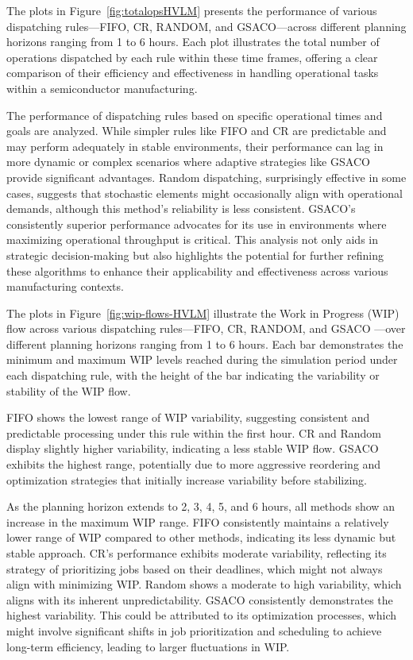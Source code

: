 The plots in Figure~\ref{fig:totalopsHVLM} presents the performance of various dispatching rules—FIFO, CR, RANDOM, and GSACO—across different planning horizons ranging from 1 to 6 hours. Each plot illustrates the total number of operations dispatched by each rule within these time frames, offering a clear comparison of their efficiency and effectiveness in handling operational tasks within a semiconductor manufacturing.

The performance of dispatching rules based on specific operational times and goals are analyzed. While simpler rules like FIFO and CR are predictable and may perform adequately in stable environments, their performance can lag in more dynamic or complex scenarios where adaptive strategies like GSACO provide significant advantages. Random dispatching, surprisingly effective in some cases, suggests that stochastic elements might occasionally align with operational demands, although this method’s reliability is less consistent. GSACO’s consistently superior performance advocates for its use in environments where maximizing operational throughput is critical. This analysis not only aids in strategic decision-making but also highlights the potential for further refining these algorithms to enhance their applicability and effectiveness across various manufacturing contexts.

The plots in Figure~\ref{fig:wip-flows-HVLM} illustrate the Work in Progress (WIP) flow across various dispatching rules—FIFO, CR, RANDOM, and GSACO —over different planning horizons ranging from 1 to 6 hours. Each bar demonstrates the minimum and maximum WIP levels reached during the simulation period under each dispatching rule, with the height of the bar indicating the variability or stability of the WIP flow.

FIFO shows the lowest range of WIP variability, suggesting consistent and predictable processing under this rule within the first hour. CR and Random display slightly higher variability, indicating a less stable WIP flow.
GSACO exhibits the highest range, potentially due to more aggressive reordering and optimization strategies that initially increase variability before stabilizing.

As the planning horizon extends to 2, 3, 4, 5, and 6 hours, all methods show an increase in the maximum WIP range. FIFO consistently maintains a relatively lower range of WIP compared to other methods, indicating its less dynamic but stable approach.
CR's performance exhibits moderate variability, reflecting its strategy of prioritizing jobs based on their deadlines, which might not always align with minimizing WIP.
Random shows a moderate to high variability, which aligns with its inherent unpredictability.
GSACO consistently demonstrates the highest variability. This could be attributed to its optimization processes, which might involve significant shifts in job prioritization and scheduling to achieve long-term efficiency, leading to larger fluctuations in WIP.

